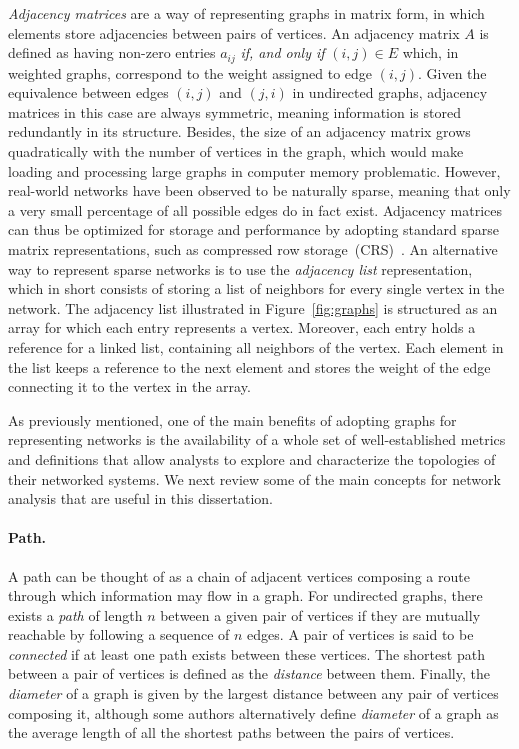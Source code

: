 \textit{Adjacency matrices} are a way of representing graphs in matrix form, in which elements store adjacencies between pairs of vertices.
An adjacency matrix $A$ is defined as having non-zero entries $a_{i j}$\textit{ if, and only if } $(i,j)\in E$ which, in weighted graphs, correspond to the weight assigned to edge $(i,j)$.
Given the equivalence between edges $(i,j)$ and $(j,i)$ in undirected graphs, adjacency matrices in this case are always symmetric, meaning information is stored redundantly in its structure.
%
Besides, the size of an adjacency matrix grows quadratically with the number of vertices in the graph, which would make loading and processing large graphs in computer memory problematic.
However, real-world networks have been observed to be naturally sparse, meaning that only a very small percentage of all possible edges do in fact exist.
Adjacency matrices can thus be optimized for storage and performance by adopting standard sparse matrix representations, such as compressed row storage~(CRS)~\cite{Saad2003}.
An alternative way to represent sparse networks is to use the \textit{adjacency list} representation, which in short consists of storing a list of neighbors for every single vertex in the network. 
The adjacency list illustrated in Figure~\ref{fig:graphs} is structured as an array for which each entry represents a vertex.
Moreover, each entry holds a reference for a linked list, containing all neighbors of the vertex. Each element in the list keeps a reference to the next element and stores the weight of the edge connecting it to the vertex in the array.


As previously mentioned, one of the main benefits of adopting graphs for representing networks is the availability of a whole set of well-established metrics and definitions that allow analysts to explore and characterize the topologies of their networked systems.
We next review some of the main concepts for network analysis that are useful in this dissertation.

\paragraph*{Path.}
A path can be thought of as a chain of adjacent vertices composing a route through which information may flow in a graph.
For undirected graphs, there exists a \textit{path} of length $n$ between a given pair of vertices if they are mutually reachable by following a sequence of $n$ edges.
A pair of vertices is said to be \textit{connected} if at least one path exists between these vertices. The shortest path between a pair of vertices is defined as the \textit{distance} between them.
Finally, the \textit{diameter} of a graph is given by the largest distance between any pair of vertices composing it, although some authors alternatively define \textit{diameter} of a graph as the average length of all the shortest paths between the pairs of vertices.

